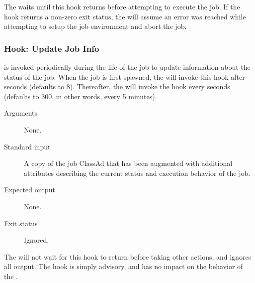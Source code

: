 The  waits until this hook returns before
attempting to execute the job.
If the hook returns a non-zero exit status, the  will
assume an error was reached while attempting to setup the job
environment and abort the job.


\subsubsection{\label{sec:job-hooks-update-job-info}
Hook: Update Job Info}

 is invoked periodically during the
life of the job to update information about the status of the job.
When the job is first spawned, the  will invoke this
hook after  seconds
(defaults to 8).
Thereafter, the  will invoke the hook every 
 seconds (defaults to 300,
in other words, every 5 minutes).

\begin{description}
\item[Arguments]
  None.

\item[Standard input]
  A copy of the job ClassAd that has been augmented with additional
  attributes describing the current status and execution behavior of
  the job.

\item[Expected output]
  None.

\item[Exit status]
  Ignored.
\end{description}

The  will not wait for this hook to return before
taking other actions, and ignores all output.
The hook is simply advisory, and has no impact on the behavior of the
.

